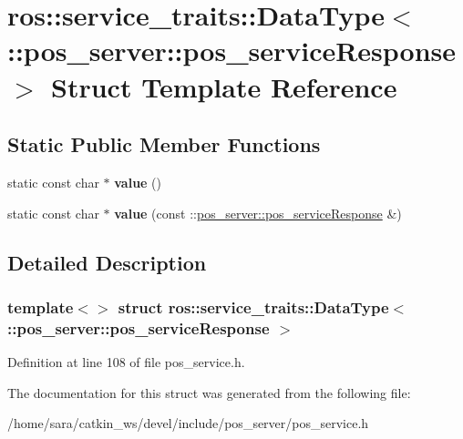 \hypertarget{structros_1_1service__traits_1_1DataType_3_01_1_1pos__server_1_1pos__serviceResponse_01_4}{}\section{ros\+:\+:service\+\_\+traits\+:\+:Data\+Type$<$ \+:\+:pos\+\_\+server\+:\+:pos\+\_\+service\+Response $>$ Struct Template Reference}
\label{structros_1_1service__traits_1_1DataType_3_01_1_1pos__server_1_1pos__serviceResponse_01_4}
\subsection*{Static Public Member Functions}
\begin{DoxyCompactItemize}
\item 
\mbox{\label{structros_1_1service__traits_1_1DataType_3_01_1_1pos__server_1_1pos__serviceResponse_01_4_ad4ecf50c3e1acf4e71cad93efcf0047a}} 
static const char $\ast$ {\bfseries value} ()
\item 
\mbox{\label{structros_1_1service__traits_1_1DataType_3_01_1_1pos__server_1_1pos__serviceResponse_01_4_abaa1eba0b11bbea34d6fbe510f2227be}} 
static const char $\ast$ {\bfseries value} (const \+::\hyperlink{structpos__server_1_1pos__serviceResponse__}{pos\+\_\+server\+::pos\+\_\+service\+Response} \&)
\end{DoxyCompactItemize}


\subsection{Detailed Description}
\subsubsection*{template$<$$>$\newline
struct ros\+::service\+\_\+traits\+::\+Data\+Type$<$ \+::pos\+\_\+server\+::pos\+\_\+service\+Response $>$}



Definition at line 108 of file pos\+\_\+service.\+h.



The documentation for this struct was generated from the following file\+:\begin{DoxyCompactItemize}
\item 
/home/sara/catkin\+\_\+ws/devel/include/pos\+\_\+server/pos\+\_\+service.\+h\end{DoxyCompactItemize}
